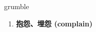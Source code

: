 
\begin{frame}
{\huge grumble}
\begin{center}
\begin{enumerate}\Large
  \item \textbf{抱怨、埋怨 (complain)}
\end{enumerate}
\end{center}
\end{frame}
